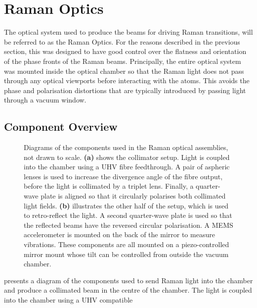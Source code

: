 \section{Raman Optics}\label{sec:setup_ramanoptics}
The optical system used to produce the beams for driving Raman transitions,
will be referred to as the Raman Optics. For the reasons described in
the previous section, this was designed to
have good control over the flatness and orientation of the phase
fronts of the Raman beams. Principally, the entire
optical system was mounted inside the optical chamber so that the Raman light
does not pass through any optical viewports before interacting with the atoms.
This avoids the phase and polarisation distortions that are typically
introduced by passing light through a vacuum window.
\subsection{Component Overview}\label{subsec:setup_ramancollimator}
\begin{figure}[!htbp]
	\centering
	\def\svgwidth{\columnwidth}
  \fontsize{18pt}{18pt}
  \subfloat[][]{\raisebox{.4\height}{\scalebox{0.4}{\label{fig:raman_collimator}}}}\quad
	\subfloat[][]{\scalebox{0.4}{\label{fig:mirror_mount}}}
	\caption[Drawings of the componets used in the Raman optics
		assemblies]{Diagrams of the components used in the Raman optical
      assemblies, not drawn to scale.
      \textbf{(a)} shows the collimator setup. Light is coupled into the chamber using a
		UHV fibre feedthrough. A pair of aspheric lenses is used to increase the
		divergence angle of the fibre output, before the light is collimated by a
		triplet lens. Finally, a quarter-wave plate is aligned so that it circularly
    polarises both collimated light fields. \textbf{(b)} illustrates the other half of the
		setup, which is used to retro-reflect the light. A second quarter-wave plate
		is used so that the reflected beams have the reversed circular
    polarisation. A MEMS accelerometer is mounted on the back of the
		mirror to measure vibrations. These components are all mounted on a
		piezo-controlled mirror mount whose tilt can be controlled from outside the
		vacuum chamber.}
	\label{fig:raman_optics}
\end{figure}
 presents a diagram of the components used to
send Raman light into the chamber and produce a collimated beam in the centre of
the chamber. The light is coupled into the chamber using a UHV compatible
